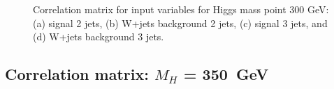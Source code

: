 \begin{figure}[bthp!]
\caption{\label{fig:FigCorr300Mu} 
Correlation matrix for input variables for Higgs mass point 300 GeV:
(a) signal 2 jets, (b) W+jets background 2 jets, 
(c) signal 3 jets, and (d) W+jets background 3 jets.
}
\end{figure}
\newpage
\subsection{Correlation matrix: \texorpdfstring{$M_H$}{M(H)} = 350~GeV}
\begin{figure}[bthp!]
\vspace*{1mm} \\
\end{figure}
